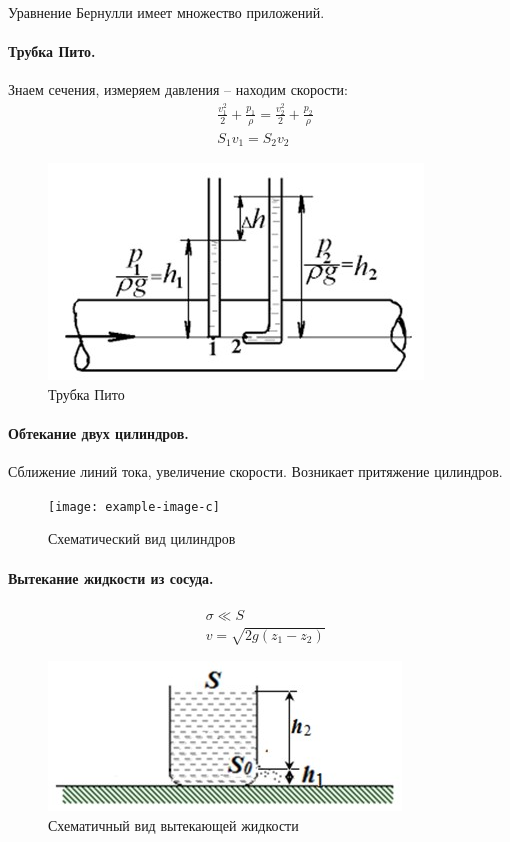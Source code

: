 Уравнение Бернулли имеет множество приложений.
\paragraph{Трубка Пито.}
Знаем сечения, измеряем давления -- находим скорости:
\begin{align*}
& \frac { v _ { 1 } ^ { 2 } } { 2 } + \frac { p _ { 1 } } { \rho } = \frac { v _ { 2 } ^ { 2 } } { 2 } + \frac { p _ { 2 } } { \rho } \\
& S _ { 1 } v _ { 1 } = S _ { 2 } v _ { 2 }
\end{align*}
\begin{figure}[H]
	\centering
	\includegraphics[scale=1]{photo/pito.jpg}
	\caption{Трубка Пито}
	\label{fig:figure8}
\end{figure}


\paragraph{Обтекание двух цилиндров.}
Сближение линий тока, увеличение скорости. Возникает притяжение цилиндров.
\begin{figure}[H]
	\centering
	\texttt{[image: example-image-c]}
	\caption{Схематический вид цилиндров}
	\label{fig:figure9}
\end{figure}

\paragraph{Вытекание жидкости из сосуда.}
\begin{align*}
& \sigma \ll S \\
& v = \sqrt { 2 g \left( z _ { 1 } - z _ { 2 } \right) }
\end{align*}
\begin{figure}[H]
	\centering
	\includegraphics[scale=1]{photo/vutekanie.jpg}
	\caption{Схематичный вид вытекающей жидкости}
	\label{fig:figure10}
\end{figure}

